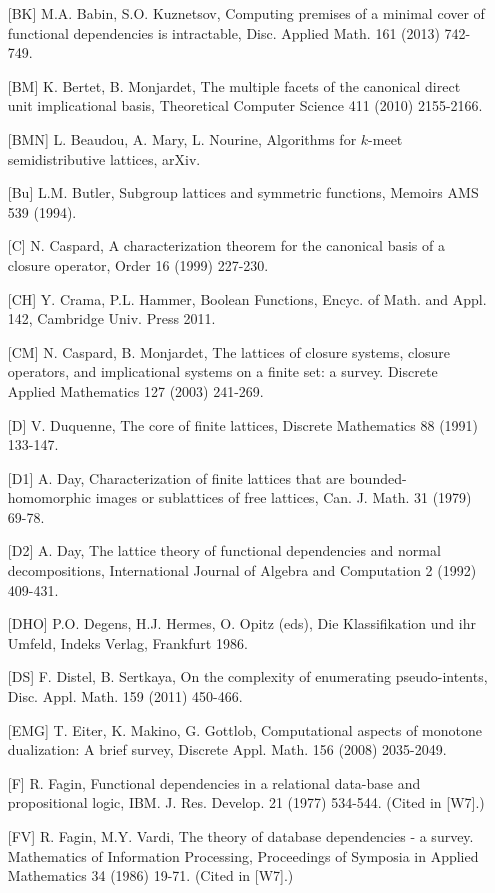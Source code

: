 \documentclass[11pt]{article}
\begin{document}
\begin{enumerate}
\item[{[BK]}] M.A. Babin, S.O. Kuznetsov, Computing premises of a minimal cover of functional dependencies is intractable, Disc. Applied Math. 161 (2013) 742-749.
	\item[{[BM]}] K. Bertet, B. Monjardet, The multiple facets of the canonical direct unit implicational basis, Theoretical Computer Science 411 (2010) 2155-2166.
\item[{[BMN]}] L. Beaudou, A. Mary, L. Nourine, Algorithms for $k$-meet semidistributive lattices, arXiv.
\item[{[Bu]}] L.M. Butler, Subgroup lattices and symmetric functions, Memoirs AMS 539 (1994).
\item[{[C]}] N. Caspard, A characterization theorem for the canonical basis of a closure operator, Order 16 (1999) 227-230.
\item[{[CH]}] Y. Crama, P.L. Hammer, Boolean Functions, Encyc. of Math. and Appl. 142, Cambridge Univ. Press 2011.
\item[{[CM]}] N. Caspard, B. Monjardet, The lattices of closure systems, closure operators, and implicational systems on a finite set: a survey. Discrete Applied Mathematics 127 (2003) 241-269.
\item[{[D]}] V. Duquenne, The core of finite lattices, Discrete Mathematics 88 (1991) 133-147.
\item[{[D1]}] A. Day, Characterization of finite lattices that are bounded-homomorphic images or sublattices of free lattices, Can. J. Math. 31 (1979) 69-78.
\item[{[D2]}] A. Day, The lattice theory of functional dependencies and normal decompositions, International Journal of Algebra and Computation 2 (1992) 409-431.
\item[{[DHO]}] P.O. Degens, H.J. Hermes, O. Opitz (eds), Die Klassifikation und ihr Umfeld, Indeks Verlag, Frankfurt 1986.
\item[{[DS]}] F. Distel, B. Sertkaya, On the complexity of enumerating pseudo-intents, Disc. Appl. Math. 159 (2011) 450-466.
\item[{[EMG]}] T. Eiter, K. Makino, G. Gottlob, Computational aspects of monotone dualization: A brief survey, Discrete Appl. Math. 156 (2008) 2035-2049.
\item[{[F]}] R. Fagin, Functional dependencies in a relational data-base and propositional logic, IBM. J. Res. Develop. 21 (1977) 534-544. (Cited in [W7].)
\item[{[FV]}] R. Fagin, M.Y. Vardi, The theory of database dependencies - a survey. Mathematics of Information Processing, Proceedings of Symposia in Applied Mathematics 34 (1986) 19-71. (Cited in [W7].)

\end{enumerate}
\end{document}
